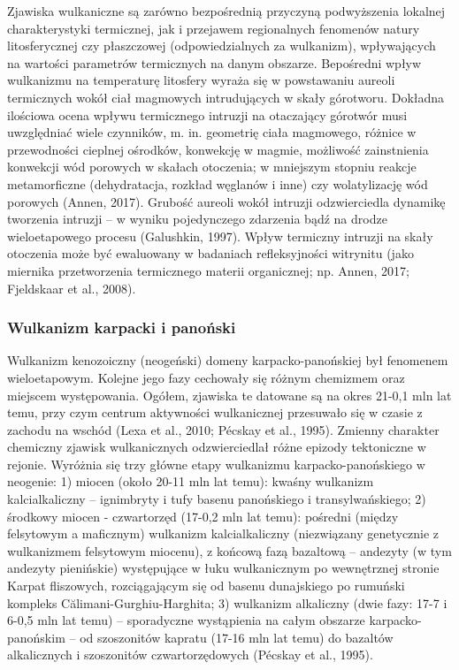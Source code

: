 \documentclass[11.5pt,twoside]{report}
\begin{document}
Zjawiska wulkaniczne są zarówno bezpośrednią przyczyną podwyższenia lokalnej charakterystyki termicznej, jak i przejawem regionalnych fenomenów natury litosferycznej czy płaszczowej (odpowiedzialnych za wulkanizm), wpływających na wartości parametrów termicznych na danym obszarze. Bepośredni wpływ wulkanizmu na temperaturę litosfery wyraża się w powstawaniu aureoli termicznych wokół ciał magmowych intrudujących w skały górotworu. Dokładna ilościowa ocena wpływu termicznego intruzji na otaczający górotwór musi uwzględniać wiele czynników, m. in. geometrię ciała magmowego, różnice w przewodności cieplnej ośrodków, konwekcję w magmie, możliwość zainstnienia konwekcji wód porowych w skałach otoczenia; w mniejszym stopniu reakcje metamorficzne (dehydratacja, rozkład węglanów i inne) czy wolatylizację wód porowych (Annen, 2017). Grubość aureoli wokół intruzji odzwierciedla dynamikę tworzenia intruzji -- w wyniku pojedynczego zdarzenia bąd\'{z} na drodze wieloetapowego procesu (Galushkin, 1997). Wpływ termiczny intruzji na skały otoczenia może być ewaluowany w badaniach refleksyjności witrynitu (jako miernika przetworzenia termicznego materii organicznej; np. Annen, 2017; Fjeldskaar et al., 2008). 

	\subsubsection{Wulkanizm karpacki i panoński}

Wulkanizm kenozoiczny (neogeński) domeny karpacko-panońskiej był fenomenem wieloetapowym. Kolejne jego fazy cechowały się różnym chemizmem oraz miejscem występowania. Ogółem, zjawiska te datowane są na okres 21-0,1 mln lat temu, przy czym centrum aktywności wulkanicznej przesuwało się w czasie z zachodu na wschód (Lexa et al., 2010; P\'{e}cskay et al., 1995). Zmienny charakter chemiczny zjawisk wulkanicznych odzwierciedlał różne epizody tektoniczne w rejonie. Wyróżnia się trzy główne etapy wulkanizmu karpacko-panońskiego w neogenie: 1) miocen (około 20-11 mln lat temu): kwaśny wulkanizm kalcialkaliczny -- ignimbryty i tufy basenu panońskiego i transylwańskiego; 2) środkowy miocen - czwartorzęd (17-0,2 mln lat temu): pośredni (między felsytowym a maficznym) wulkanizm kalcialkaliczny (niezwiązany genetycznie z wulkanizmem felsytowym miocenu), z końcową fazą bazaltową -- andezyty (w tym andezyty pienińskie) występujące w łuku wulkanicznym po wewnętrznej stronie Karpat fliszowych, rozciągającym się od basenu dunajskiego po rumuński kompleks Călimani-Gurghiu-Harghita; 3) wulkanizm alkaliczny (dwie fazy: 17-7 i 6-0,5 mln lat temu) -- sporadyczne wystąpienia na całym obszarze karpacko-panońskim -- od szoszonitów kapratu (17-16 mln lat temu) do bazaltów alkalicznych i szoszonitów czwartorzędowych (P\'{e}cskay et al., 1995).
  
\end{document}
